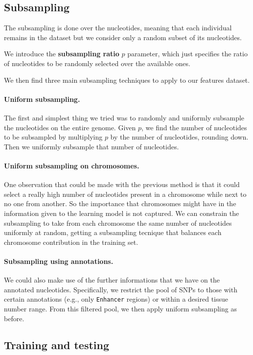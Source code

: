 \subsection{Subsampling}

The subsampling is done over the nucleotides, meaning that each individual remains in the dataset but we consider only a random subset of its nucleotides.

We introduce the \textbf{subsampling ratio} $p$ parameter, which just specifies the ratio of nucleotides to be randomly selected over the available ones.

We then find three main subsampling techniques to apply to our features dataset.

\paragraph{Uniform subsampling.}
The first and simplest thing we tried was to randomly and uniformly subsample the nucleotides on the entire genome.
Given $p$, we find the number of nucleotides to be subsampled by multiplying $p$ by the number of nucleotides, rounding down.
Then we uniformly subsample that number of nucleotides.

\paragraph{Uniform subsampling on chromosomes.}
One observation that could be made with the previous method is that it could select a really high number of nucleotides present in a chromosome while next to no one from another. 
So the importance that chromosomes might have in the information given to the learning model is not captured. 
We can constrain the subsampling to take from each chromosome the same number of nucleotides uniformly at random, getting a subsampling tecnique that balances each chromosome contribution in the training set.

\paragraph{Subsampling using annotations.}
We could also make use of the further informations that we have on the annotated nucleotides.
Specifically, we restrict the pool of SNPs to those with certain annotations (e.g., only \texttt{Enhancer} regions) or within a desired tissue number range. From this filtered pool, we then apply uniform subsampling as before.


\subsection{Training and testing}

